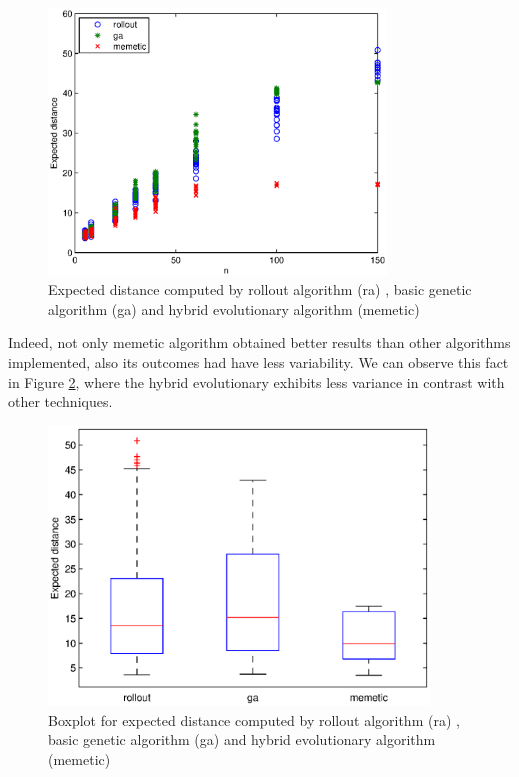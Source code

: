\begin{figure}[!htbp]
  \begin{center}
   \includegraphics[width=0.8\textwidth]{Images/Chapter5/comparative_results.eps}
  \end{center}
    \caption{Expected distance computed by rollout algorithm (ra) , basic genetic algorithm (ga) and hybrid evolutionary algorithm (memetic)}\label{fig:comparative_results}
\end{figure}


Indeed, not only memetic algorithm obtained better results than other algorithms implemented, also its outcomes had have less variability. We can observe this fact in Figure \ref{fig:comparative_results_box}, where the hybrid evolutionary exhibits less variance in contrast with other techniques.

\begin{figure}[!htbp]
  \begin{center}
   \includegraphics[width=0.9\textwidth]{Images/Chapter5/comparative_results_box.eps}
  \end{center}
    \caption{Boxplot for expected distance computed by rollout algorithm (ra) , basic genetic algorithm (ga) and hybrid evolutionary algorithm (memetic)}\label{fig:comparative_results_box}
\end{figure}

